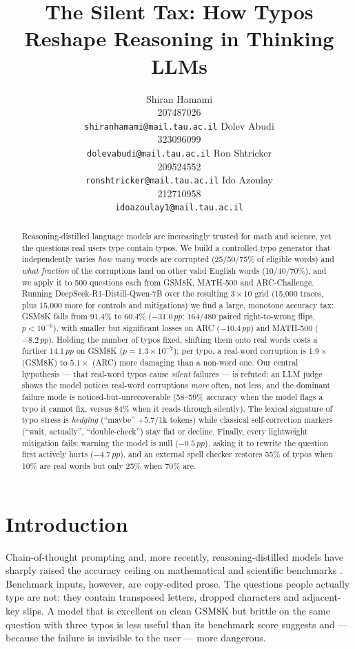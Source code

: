 \documentclass[11pt]{article}
\title{The Silent Tax: How Typos Reshape Reasoning in Thinking LLMs}
\author{%
  Shiran Hamami \\ 207487026 \\ \small\texttt{shiranhamami@mail.tau.ac.il}
  \And
  Dolev Abudi \\ 323096099 \\ \small\texttt{dolevabudi@mail.tau.ac.il}
  \AND
  Ron Shtricker \\ 209524552 \\ \small\texttt{ronshtricker@mail.tau.ac.il}
  \And
  Ido Azoulay \\ 212710958 \\ \small\texttt{idoazoulay1@mail.tau.ac.il}
}
\newcommand{\pp}{\,pp}
\begin{document}
\maketitle

\begin{abstract}
Reasoning-distilled language models are increasingly trusted for math and
science, yet the questions real users type contain typos. We build a controlled
typo generator that independently varies \emph{how many} words are corrupted
(25/50/75\% of eligible words) and \emph{what fraction} of the corruptions land
on other valid English words (10/40/70\%), and we apply it to 500 questions each
from GSM8K, MATH-500 and ARC-Challenge. Running
DeepSeek-R1-Distill-Qwen-7B over the resulting $3\times10$ grid (15{,}000
traces, plus 15{,}000 more for controls and mitigations) we find a large,
monotone accuracy tax: GSM8K falls from 91.4\% to 60.4\% ($-31.0\pp$;
$164/480$ paired right-to-wrong flips, $p<10^{-6}$), with smaller but
significant losses on ARC ($-10.4\pp$) and MATH-500 ($-8.2\pp$). Holding the
number of typos fixed, shifting them onto real words costs a further
$14.1\pp$ on GSM8K ($p=1.3\times10^{-7}$); per typo, a real-word corruption is
$1.9\times$ (GSM8K) to $5.1\times$ (ARC) more damaging than a non-word one. Our
central hypothesis --- that real-word typos cause \emph{silent} failures ---
is refuted: an LLM judge shows the model notices real-word corruptions
\emph{more} often, not less, and the dominant failure mode is
noticed-but-unrecoverable (58--59\% accuracy when the model flags a typo it
cannot fix, versus 84\% when it reads through silently). The lexical
signature of typo stress is \emph{hedging} (``maybe'' $+5.7$/1k tokens) while
classical self-correction markers (``wait, actually'', ``double-check'')
stay flat or decline. Finally, every lightweight mitigation fails: warning the
model is null ($-0.5\pp$), asking it to rewrite the question first actively
hurts ($-4.7\pp$), and an external spell checker restores 55\% of typos when
10\% are real words but only 25\% when 70\% are.
\end{abstract}

\section{Introduction}
\label{sec:intro}

Chain-of-thought prompting and, more recently, reasoning-distilled models have
sharply raised the accuracy ceiling on mathematical and scientific
benchmarks \citep{wei2022,deepseekr1}. Benchmark inputs, however, are
copy-edited prose. The questions people actually type are not: they contain
transposed letters, dropped characters and adjacent-key slips. A model that is
excellent on clean GSM8K but brittle on the same question with three typos is
less useful than its benchmark score suggests and --- because the failure is
invisible to the user --- more dangerous.
\end{document}
